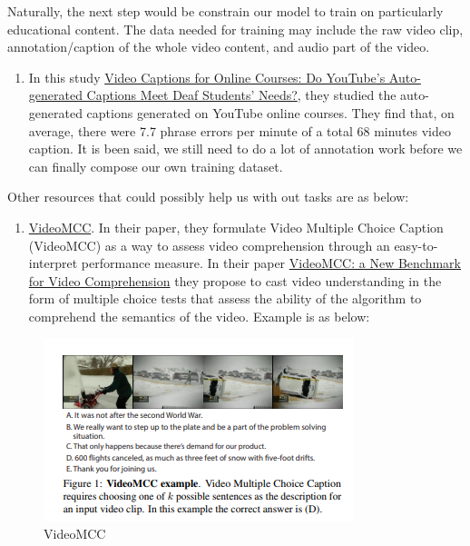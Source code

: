 \documentclass[]{book}
\providecommand{\tightlist}{%
  \setlength{\itemsep}{0pt}\setlength{\parskip}{0pt}}
\theoremstyle{definition}
\theoremstyle{definition}
\theoremstyle{definition}
\theoremstyle{remark}
\begin{document}
Naturally, the next step would be constrain our model to train on
particularly educational content. The data needed for training may
include the raw video clip, annotation/caption of the whole video
content, and audio part of the video.

\begin{enumerate}
\def\labelenumi{\arabic{enumi}.}
\setcounter{enumi}{1}
\tightlist
\item
  In this study
  \href{http://jofdl.nz/index.php/JOFDL/article/download/255/198}{Video
  Captions for Online Courses: Do YouTube's Auto-generated Captions Meet
  Deaf Students' Needs?}, they studied the auto-generated captions
  generated on YouTube online courses. They find that, on average, there
  were 7.7 phrase errors per minute of a total 68 minutes video caption.
  It is been said, we still need to do a lot of annotation work before
  we can finally compose our own training dataset.
\end{enumerate}

Other resources that could possibly help us with out tasks are as below:

\begin{enumerate}
\def\labelenumi{\arabic{enumi}.}
\setcounter{enumi}{2}
\tightlist
\item
  \href{http://videomcc.org/}{VideoMCC}. In their paper, they formulate
  Video Multiple Choice Caption (VideoMCC) as a way to assess video
  comprehension through an easy-to-interpret performance measure. In
  their paper \href{https://arxiv.org/pdf/1606.07373.pdf}{VideoMCC: a
  New Benchmark for Video Comprehension} they propose to cast video
  understanding in the form of multiple choice tests that assess the
  ability of the algorithm to comprehend the semantics of the video.
  Example is as below:
\end{enumerate}

\begin{figure}
\centering
\includegraphics{img/mcc.png}
\caption{VideoMCC}
\end{figure}
\end{document}
